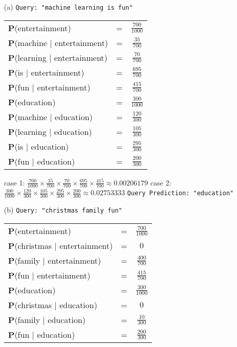 \documentclass[10pt,a4paper]{article}
\newcommand{\p}{\textbf{P}}
\begin{document}
		\begin{enumerate}
			\item[(a)] \texttt{Query: "machine learning is fun"}
				\begin{table}[h!]
					\begin{tabular}{lcc}
						\p(entertainment) & = & $\frac{700}{1000}$ \\
						\p(machine | entertainment) & = & $\frac{35}{700}$ \\
						\p(learning | entertainment) & = & $\frac{70}{700}$ \\
						\p(is | entertainment) & = & $\frac{695}{700}$ \\
						\p(fun | entertainment) & = & $\frac{415}{700}$ \\
						\p(education) & = & $\frac{300}{1000}$ \\
						\p(machine | education) & = & $\frac{120}{300}$ \\
						\p(learning | education) & = & $\frac{105}{300}$ \\
						\p(is | education) & = & $\frac{295}{300}$ \\
						\p(fun | education) & = & $\frac{200}{300}$ \\
					\end{tabular}
				\end{table}
			
				case 1: $\frac{700}{1000} \times \frac{35}{700} \times \frac{70}{700} \times \frac{695}{700} \times \frac{415}{700} \approx 0.00206179 $ \newline \newline
				case 2: $ \frac{300}{1000} \times \frac{120}{300} \times \frac{105}{300} \times \frac{295}{300} \times \frac{200}{300} \approx 0.02753333 $ \newline \newline
				\texttt{Query Prediction: "education"}
			
			\item[(b)] \texttt{Query: "christmas family fun"}
			\begin{table}[h!]
				\begin{tabular}{lcc}
					\p(entertainment) & = & $\frac{700}{1000}$ \\
					\p(christmas | entertainment) & = & $0$ \\
					\p(family | entertainment) & = & $\frac{400}{700}$ \\
					\p(fun | entertainment) & = & $\frac{415}{700}$ \\
					\p(education) & = & $\frac{300}{1000}$ \\
					\p(christmas | education) & = & $0$ \\
					\p(family | education) & = & $\frac{10}{300}$ \\
					\p(fun | education) & = & $\frac{200}{300}$ \\
				\end{tabular}
			\end{table}
			

\end{enumerate}
\end{document}
